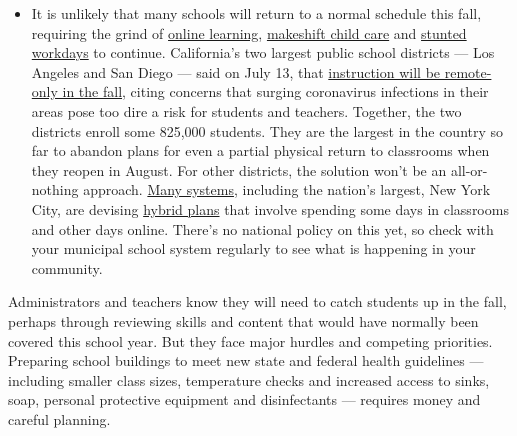 \begin{itemize}
  \begin{itemize}
  \tightlist
  \item
    It is unlikely that many schools will return to a normal schedule
    this fall, requiring the grind of
    \href{https://www.nytimes3xbfgragh.onion/2020/06/05/us/coronavirus-education-lost-learning.html?action=click\&pgtype=Article\&state=default\&region=MAIN_CONTENT_3\&context=storylines_faq}{online
    learning},
    \href{https://www.nytimes3xbfgragh.onion/2020/05/29/us/coronavirus-child-care-centers.html?action=click\&pgtype=Article\&state=default\&region=MAIN_CONTENT_3\&context=storylines_faq}{makeshift
    child care} and
    \href{https://www.nytimes3xbfgragh.onion/2020/06/03/business/economy/coronavirus-working-women.html?action=click\&pgtype=Article\&state=default\&region=MAIN_CONTENT_3\&context=storylines_faq}{stunted
    workdays} to continue. California's two largest public school
    districts --- Los Angeles and San Diego --- said on July 13, that
    \href{https://www.nytimes3xbfgragh.onion/2020/07/13/us/lausd-san-diego-school-reopening.html?action=click\&pgtype=Article\&state=default\&region=MAIN_CONTENT_3\&context=storylines_faq}{instruction
    will be remote-only in the fall}, citing concerns that surging
    coronavirus infections in their areas pose too dire a risk for
    students and teachers. Together, the two districts enroll some
    825,000 students. They are the largest in the country so far to
    abandon plans for even a partial physical return to classrooms when
    they reopen in August. For other districts, the solution won't be an
    all-or-nothing approach.
    \href{https://bioethics.jhu.edu/research-and-outreach/projects/eschool-initiative/school-policy-tracker/}{Many
    systems}, including the nation's largest, New York City, are
    devising
    \href{https://www.nytimes3xbfgragh.onion/2020/06/26/us/coronavirus-schools-reopen-fall.html?action=click\&pgtype=Article\&state=default\&region=MAIN_CONTENT_3\&context=storylines_faq}{hybrid
    plans} that involve spending some days in classrooms and other days
    online. There's no national policy on this yet, so check with your
    municipal school system regularly to see what is happening in your
    community.
  \end{itemize}
\end{itemize}

Administrators and teachers know they will need to catch students up in
the fall, perhaps through reviewing skills and content that would have
normally been covered this school year. But they face major hurdles and
competing priorities. Preparing school buildings to meet new state and
federal health guidelines --- including smaller class sizes, temperature
checks and increased access to sinks, soap, personal protective
equipment and disinfectants --- requires money and careful planning.

